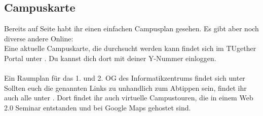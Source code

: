 \subsection{Campuskarte}
\label{campuskarte}
Bereits auf Seite \pageref{plan} habt ihr einen einfachen Campusplan
gesehen. Es gibt aber noch diverse andere Online:\\
Eine aktuelle Campuskarte, die durchsucht werden kann findet sich im
TUgether Portal unter . Du
kannst dich dort mit deiner Y-Nummer einloggen.\\\\

Ein Raumplan für das 1. und 2. OG des Informatikzentrums findet sich
unter\\ 
Sollten euch die genannten Links zu unhandlich zum Abtippen sein, findet ihr
auch alle unter
.
Dort findet ihr auch virtuelle Campustouren, die  in einem Web 2.0 Seminar entstanden und
bei Google Maps gehostet sind.
